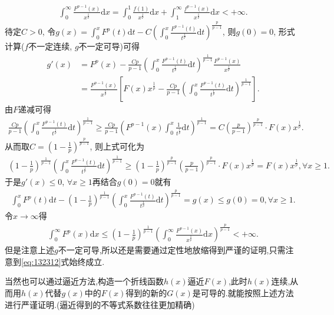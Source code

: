 \documentclass[../../main.tex]{subfiles}%
\begin{document}
\begin{note}
\begin{align*}
\int_0^{\infty}{\frac{F^{p-1}\left( x \right)}{x^{\frac{1}{p}}}\mathrm{d}x}=\int_0^1{\frac{f\left( 1 \right)}{x^{\frac{1}{p}}}\mathrm{d}x}+\int_1^{\infty}{\frac{f^{p-1}\left( x \right)}{x^{\frac{1}{p}}}\mathrm{d}x}<+\infty .
\end{align*}
待定$C>0$, 令$g\left( x \right) =\int_0^x{F^p\left( t \right)}\mathrm{d}t-C\left( \int_0^x{\frac{F^{p-1}\left( t \right)}{t^{\frac{1}{p}}}\mathrm{d}t} \right) ^{\frac{p}{p-1}}$, 则$g\left( 0 \right) =0$, 形式计算($f$不一定连续, $g$不一定可导)可得
\begin{align*}
g' \left( x \right) &=F^p\left( x \right) -\frac{Cp}{p-1}\left( \int_0^x{\frac{F^{p-1}\left( t \right)}{t^{\frac{1}{p}}}\mathrm{d}t} \right) ^{\frac{1}{p-1}}\frac{F^{p-1}\left( x \right)}{x^{\frac{1}{p}}}\\
&=\frac{F^{p-1}\left( x \right)}{x^{\frac{1}{p}}}\left[ F\left( x \right) x^{\frac{1}{p}}-\frac{Cp}{p-1}\left( \int_0^x{\frac{F^{p-1}\left( t \right)}{t^{\frac{1}{p}}}\mathrm{d}t} \right) ^{\frac{1}{p-1}} \right] .
\end{align*}
由$F$递减可得
\begin{align*}
\frac{Cp}{p-1}\left( \int_0^x{\frac{F^{p-1}\left( t \right)}{t^{\frac{1}{p}}}\mathrm{d}t} \right) ^{\frac{1}{p-1}}\geqslant \frac{Cp}{p-1}\left( F^{p-1}\left( x \right) \int_0^x{\frac{1}{t^{\frac{1}{p}}}\mathrm{d}t} \right) ^{\frac{1}{p-1}}=C\left( \frac{p}{p-1} \right) ^{\frac{p}{p-1}}\cdot F\left( x \right) x^{\frac{1}{p}}.
\end{align*}
从而取$C=\left( 1-\frac{1}{p} \right) ^{\frac{p}{p-1}}$, 则上式可化为
\begin{align}
\left( 1-\frac{1}{p} \right) ^{\frac{1}{p-1}}\left( \int_0^x{\frac{F^{p-1}\left( t \right)}{t^{\frac{1}{p}}}\mathrm{d}t} \right) ^{\frac{1}{p-1}}\geqslant \left( 1-\frac{1}{p} \right) ^{\frac{p}{p-1}}\left( \frac{p}{p-1} \right) ^{\frac{p}{p-1}}\cdot F\left( x \right) x^{\frac{1}{p}}=F\left( x \right) x^{\frac{1}{p}},\forall x\geqslant 1.\label{eq:132312}
\end{align}
于是$g' \left( x \right) \leqslant 0$, $\forall x\geqslant 1$再结合$g\left( 0 \right) =0$就有
\begin{align*}
\int_0^x{F^p\left( t \right)}\mathrm{d}t-\left( 1-\frac{1}{p} \right) ^{\frac{1}{p-1}}\left( \int_0^x{\frac{F^{p-1}\left( t \right)}{t^{\frac{1}{p}}}\mathrm{d}t} \right) ^{\frac{p}{p-1}}=g\left( x \right) \leqslant g\left( 0 \right) =0,\forall x\geqslant 1.
\end{align*}
令$x\rightarrow \infty$得
\begin{align*}
\int_0^{\infty}{F^p\left( x \right)}\mathrm{d}x\leqslant \left( 1-\frac{1}{p} \right) ^{\frac{1}{p-1}}\left( \int_0^{\infty}{\frac{F^{p-1}\left( x \right)}{x^{\frac{1}{p}}}\mathrm{d}x} \right) ^{\frac{p}{p-1}}<+\infty .
\end{align*}
但是注意上述$g$不一定可导,所以还是需要通过定性地放缩得到严谨的证明,只需注意到\eqref{eq:132312}式始终成立.

当然也可以通过逼近方法,构造一个折线函数$h(x)$逼近$F(x)$,此时$h(x)$连续,从而用$h(x)$代替$g(x)$中的$F(x)$得到的新的$G(x)$是可导的.就能按照上述方法进行严谨证明.(逼近得到的不等式系数往往更加精确)
\end{note}
\end{document}
